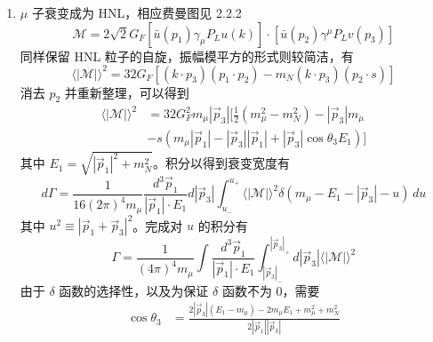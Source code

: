\documentclass[printMode=false, declarePage=false]{ecnuthesis}
\begin{document}
\begin{appendix}
\begin{enumerate}
    \item $\mu$ 子衰变成为 HNL，相应费曼图见 2.2.2
          \begin{equation}
            \mathcal{M} = 2\sqrt{2} G_F [\bar{u}(p_1) \gamma_\mu P_L u(k)] \cdot [\bar{u}(p_2) \gamma^\mu P_L v(p_3) ]
          \end{equation}
          同样保留 HNL 粒子的自旋，振幅模平方的形式则较简洁，有
          \begin{equation}
            \langle |\mathcal{M}| \rangle^2 = 32 G_F [(k \cdot p_3)(p_1 \cdot p_2) - m_N (k \cdot p_3) (p_2 \cdot s)]
          \end{equation}
          消去 $p_2$ 并重新整理，可以得到
          \begin{equation}
            \begin{split}
              \langle |\mathcal{M}| \rangle^2 & = 32 G_F^2 m_\mu |\overrightarrow{p}_3| [ \frac{1}{2}(m_\mu^2 - m_N^2)  - |\overrightarrow{p}_3| m_\mu                                  \\
                                              & - s \left(m_\mu |\overrightarrow{p}_1| - |\overrightarrow{p}_3| |\overrightarrow{p}_1| + |\overrightarrow{p}_3| \cos{θ_3} E_1\right) ]
            \end{split}
          \end{equation}
          其中 $E_1=\sqrt{|\overrightarrow{p}_1|^2 + m_N^2}$。积分以得到衰变宽度有
          \begin{equation}
            d \Gamma = \frac{1}{16(2\pi)^4 m_\mu} \frac{d^3 \overrightarrow{p}_1}
            {|\overrightarrow{p}_1| \cdot E_1} d |\overrightarrow{p}_3| \int_{u_-}^{u_+} \langle |\mathcal{M}| \rangle^2 \delta(m_\mu - E_1 - |\overrightarrow{p}_3| - u) \, d u
          \end{equation}
          其中 $u^2 \equiv |\overrightarrow{p}_1 + \overrightarrow{p}_3|^2$。完成对 $u$ 的积分有
          \begin{equation}
            \Gamma = \frac{1}{(4\pi)^4 m_\mu} \int \frac{d^3 \overrightarrow{p}_1}{|\overrightarrow{p}_1| \cdot E_1} \int_{|\overrightarrow{p}_3|_{-}}^{|\overrightarrow{p}_3|_{+}}
            d |\overrightarrow{p}_3| \langle |\mathcal{M}| \rangle^2
          \end{equation}
          由于 $\delta$ 函数的选择性，以及为保证 $\delta$ 函数不为 0，需要
          \begin{align}
            \cos{\theta_3}               & = \frac{2 |\overrightarrow{p}_3| (E_1 - m_\mu) -2 m_\mu E_1 + m_\mu^2 + m_N^2}{2 |\overrightarrow{p}_1| |\overrightarrow{p}_3|} \\

\end{align}
\end{enumerate}
\end{appendix}
\end{document}
